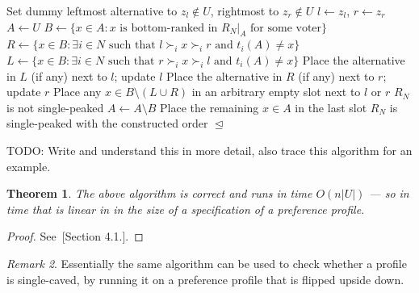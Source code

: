 \documentclass{book}
\newcommand{\unclear}[1]{%
  \par\noindent
  \colorbox{yellow!30}{#1}\par
}
\theoremstyle{plain}
\newtheorem{theorem}{Theorem}[subsection]
\theoremstyle{definition}
\theoremstyle{remark}
\newtheorem{remark}[theorem]{Remark}
\begin{document}
\begin{algorithm}[H]
\caption{Single-Peaked Recognition}
\begin{algorithmic}[1]
\State Set dummy leftmost alternative to $z_l \notin U$, rightmost to $z_r \notin U$
\State $l \gets z_l$, $r \gets z_r$
\State $A \gets U$
    \State $B \gets \{x \in A : x \text{ is bottom-ranked in } R_N|_A \text{ for some voter}\}$
    \State $R \gets \{x \in B : \exists i \in N \text{ such that } l \succ_i x \succ_i r \text{ and } t_i(A) \neq x\}$
    \State $L \gets \{x \in B : \exists i \in N \text{ such that } r \succ_i x \succ_i l \text{ and } t_i(A) \neq x\}$
        \State Place the alternative in $L$ (if any) next to $l$; update $l$
        \State Place the alternative in $R$ (if any) next to $r$; update $r$
        \State Place any $x \in B \setminus (L \cup R)$ in an arbitrary empty slot next to $l$ or $r$
    \Else
        \State \Return $R_N$ is not single-peaked
    \EndIf
    \State $A \gets A \setminus B$
\EndWhile
{}
    \State Place the remaining $x \in A$ in the last slot
\EndIf
\State \Return $R_N$ is single-peaked with the constructed order $\trianglelefteq$
\end{algorithmic}
\end{algorithm}
\unclear{TODO: Write and understand this in more detail, also trace this algorithm for an example.}

\begin{theorem}
    The above algorithm 
    is correct and 
    runs in time $O(n|U|)$ 
    --- so in time that is linear in 
    in the size of a specification of 
    a preference profile.
\end{theorem}
\begin{proof}
    See~\cite{ElkindLP2022}[Section 4.1.].
\end{proof}

\begin{remark}
    Essentially the same algorithm
    can be used to check whether a profile is single-caved,
    by running it on a preference profile that is flipped upside down.
\end{remark}
\end{document}
